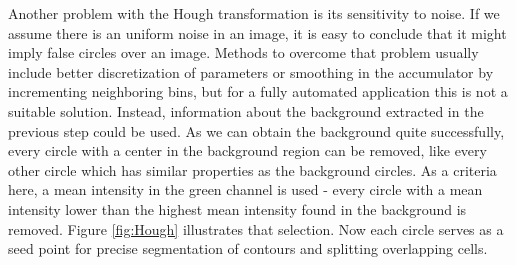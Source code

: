 Another problem with the Hough transformation is its sensitivity to noise. If we assume there is an uniform noise in an image, it is easy to conclude that it might imply false circles over an image. Methods to overcome that problem usually include better discretization of parameters or smoothing in the accumulator by incrementing neighboring bins, but for a fully automated application this is not a suitable solution. Instead, information about the background extracted in the previous step could be used. As we can obtain the background quite successfully, every circle with a center in the background region can be removed, like every other circle which has similar properties as the background circles. As a criteria here, a mean intensity in the green channel is used - every circle with a mean intensity lower than the highest mean intensity found in the background is removed. Figure \ref{fig:Hough} illustrates that selection. Now each circle serves as a seed point for precise segmentation of contours and splitting overlapping cells.

